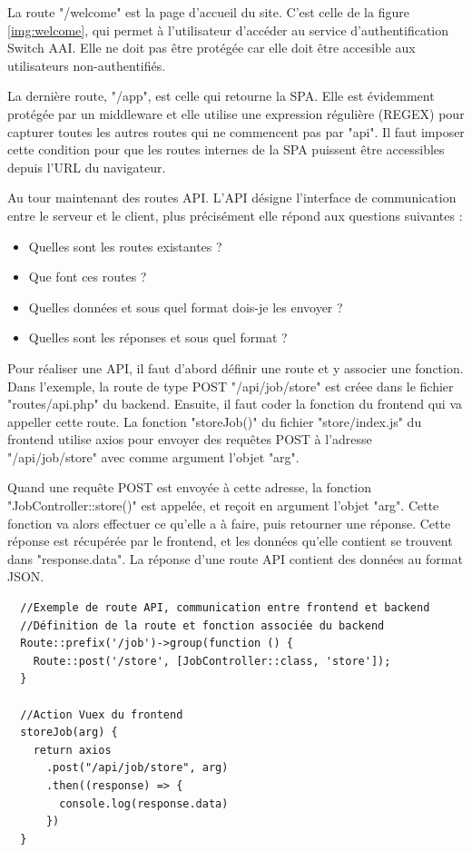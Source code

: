 \documentclass[
    iai, %
    eai, %
]{heig-tb}
\begin{document}
La route "/welcome" est la page d'accueil du site. C'est celle de la figure \ref{img:welcome}, qui permet à l'utilisateur d'accéder au service d'authentification Switch AAI. Elle ne doit pas être protégée car elle doit être accesible aux utilisateurs non-authentifiés.

La dernière route, "/app", est celle qui retourne la SPA. Elle est évidemment protégée par un middleware et elle utilise une expression régulière (REGEX) pour capturer toutes les autres routes qui ne commencent pas par "api". Il faut imposer cette condition pour que les routes internes de la SPA puissent être accessibles depuis l'URL du navigateur.

\newpage
Au tour maintenant des routes API. L'API désigne l'interface de communication entre le serveur et le client, plus précisément elle répond aux questions suivantes :
\begin{itemize}
  \item Quelles sont les routes existantes ?
  \item Que font ces routes ?
  \item Quelles données et sous quel format dois-je les envoyer ?
  \item Quelles sont les réponses et sous quel format ?
\end{itemize}
\bigskip

Pour réaliser une API, il faut d'abord définir une route et y associer une fonction. Dans l'exemple, la route de type POST "/api/job/store" est créee dans le fichier "routes/api.php" du backend.
Ensuite, il faut coder la fonction du frontend qui va appeller cette route. La fonction "storeJob()" du fichier "store/index.js" du frontend utilise axios pour envoyer des requêtes POST à l'adresse "/api/job/store" avec comme argument l'objet "arg".

Quand une requête POST est envoyée à cette adresse, la fonction "JobController::store()" est appelée, et reçoit en argument l'objet "arg". Cette fonction va alors effectuer ce qu'elle a à faire, puis retourner une réponse. Cette réponse est récupérée par le frontend, et les données qu'elle contient se trouvent dans "response.data". La réponse d'une route API contient des données au format JSON.

\begin{verbatim}
  //Exemple de route API, communication entre frontend et backend
  //Définition de la route et fonction associée du backend
  Route::prefix('/job')->group(function () {
    Route::post('/store', [JobController::class, 'store']);
  }

  //Action Vuex du frontend
  storeJob(arg) {
    return axios
      .post("/api/job/store", arg)
      .then((response) => {
        console.log(response.data)
      })
  }
\end{verbatim}
\end{document}
